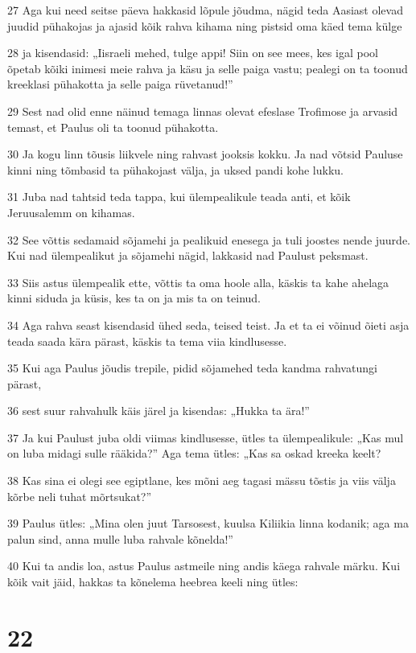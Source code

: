\par 27 Aga kui need seitse päeva hakkasid lõpule jõudma, nägid teda Aasiast olevad juudid pühakojas ja ajasid kõik rahva kihama ning pistsid oma käed tema külge
\par 28 ja kisendasid: „Iisraeli mehed, tulge appi! Siin on see mees, kes igal pool õpetab kõiki inimesi meie rahva ja käsu ja selle paiga vastu; pealegi on ta toonud kreeklasi pühakotta ja selle paiga rüvetanud!”
\par 29 Sest nad olid enne näinud temaga linnas olevat efeslase Trofimose ja arvasid temast, et Paulus oli ta toonud pühakotta.
\par 30 Ja kogu linn tõusis liikvele ning rahvast jooksis kokku. Ja nad võtsid Pauluse kinni ning tõmbasid ta pühakojast välja, ja uksed pandi kohe lukku.
\par 31 Juba nad tahtsid teda tappa, kui ülempealikule teada anti, et kõik Jeruusalemm on kihamas.
\par 32 See võttis sedamaid sõjamehi ja pealikuid enesega ja tuli joostes nende juurde. Kui nad ülempealikut ja sõjamehi nägid, lakkasid nad Paulust peksmast.
\par 33 Siis astus ülempealik ette, võttis ta oma hoole alla, käskis ta kahe ahelaga kinni siduda ja küsis, kes ta on ja mis ta on teinud.
\par 34 Aga rahva seast kisendasid ühed seda, teised teist. Ja et ta ei võinud õieti asja teada saada kära pärast, käskis ta tema viia kindlusesse.
\par 35 Kui aga Paulus jõudis trepile, pidid sõjamehed teda kandma rahvatungi pärast,
\par 36 sest suur rahvahulk käis järel ja kisendas: „Hukka ta ära!”
\par 37 Ja kui Paulust juba oldi viimas kindlusesse, ütles ta ülempealikule: „Kas mul on luba midagi sulle rääkida?” Aga tema ütles: „Kas sa oskad kreeka keelt?
\par 38 Kas sina ei olegi see egiptlane, kes mõni aeg tagasi mässu tõstis ja viis välja kõrbe neli tuhat mõrtsukat?”
\par 39 Paulus ütles: „Mina olen juut Tarsosest, kuulsa Kiliikia linna kodanik; aga ma palun sind, anna mulle luba rahvale kõnelda!”
\par 40 Kui ta andis loa, astus Paulus astmeile ning andis käega rahvale märku. Kui kõik vait jäid, hakkas ta kõnelema heebrea keeli ning ütles:


\chapter{22}

